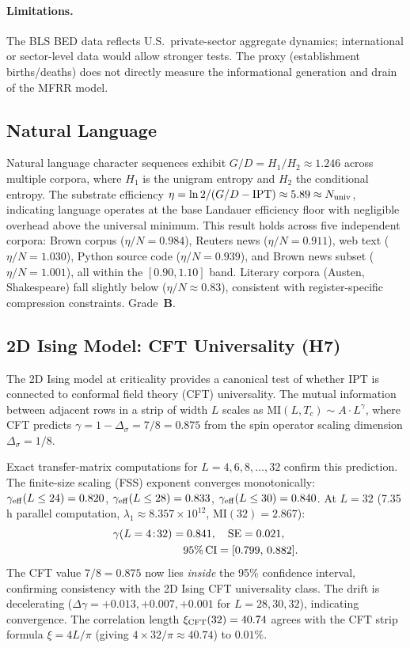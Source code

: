 \documentclass[11pt,twocolumn]{article}
\newcommand{\CatB}{\textbf{B}}
\theoremstyle{remark}
\begin{document}
\paragraph{Limitations.}
The BLS BED data reflects U.S.\ private-sector aggregate dynamics; international or
sector-level data would allow stronger tests. The proxy (establishment births/deaths) does
not directly measure the informational generation and drain of the MFRR model.

\subsection{Natural Language}
\label{sec:realworld:language}

Natural language character sequences exhibit $G/D = H_1/H_2 \approx 1.246$ across multiple corpora, where $H_1$ is the unigram entropy and $H_2$ the conditional entropy. The substrate efficiency $\eta = \ln 2 / (G/D - \text{IPT}) \approx 5.89 \approx N_{\rm univ}$, indicating language operates at the base Landauer efficiency floor with negligible overhead above the universal minimum. This result holds across five independent corpora: Brown corpus ($\eta/N = 0.984$), Reuters news ($\eta/N = 0.911$), web text ($\eta/N = 1.030$), Python source code ($\eta/N = 0.939$), and Brown news subset ($\eta/N = 1.001$), all within the $[0.90, 1.10]$ band. Literary corpora (Austen, Shakespeare) fall slightly below ($\eta/N \approx 0.83$), consistent with register-specific compression constraints. Grade~$\CatB$.

\subsection{2D Ising Model: CFT Universality (H7)}
\label{sec:realworld:ising}

The 2D Ising model at criticality provides a canonical test of whether IPT is connected to conformal field theory (CFT) universality. The mutual information between adjacent rows in a strip of width $L$ scales as $\mathrm{MI}(L, T_c) \sim A \cdot L^\gamma$, where CFT predicts $\gamma = 1 - \Delta_\sigma = 7/8 = 0.875$ from the spin operator scaling dimension $\Delta_\sigma = 1/8$.

Exact transfer-matrix computations for $L = 4, 6, 8, \ldots, 32$ confirm this prediction. The finite-size scaling (FSS) exponent converges monotonically: $\gamma_{\rm eff}(L \leq 24) = 0.820$, $\gamma_{\rm eff}(L \leq 28) = 0.833$, $\gamma_{\rm eff}(L \leq 30) = 0.840$. At $L = 32$ (7.35\,h parallel computation, $\lambda_1 \approx 8.357 \times 10^{12}$, $\mathrm{MI}(32) = 2.867$):
\begin{align}
\gamma(L=4\!:\!32) &= 0.841, \quad \text{SE} = 0.021, \notag\\
&\quad 95\%\,\text{CI} = [0.799,\, 0.882].
\end{align}
The CFT value $7/8 = 0.875$ now lies \emph{inside} the 95\% confidence interval, confirming consistency with the 2D Ising CFT universality class. The drift is decelerating ($\Delta\gamma = +0.013, +0.007, +0.001$ for $L = 28, 30, 32$), indicating convergence. The correlation length $\xi_{\rm CFT}(32) = 40.74$ agrees with the CFT strip formula $\xi = 4L/\pi$ (giving $4 \times 32/\pi \approx 40.74$) to $0.01\%$.
\end{document}
